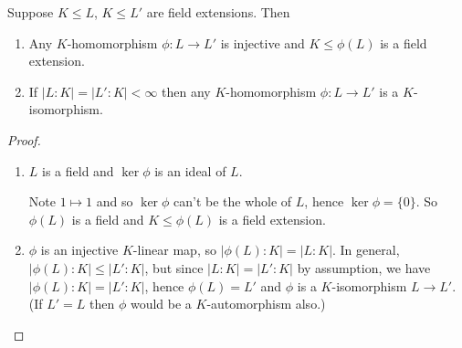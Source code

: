 \documentclass{article}
\begin{document}
\begin{nlemma}\label{lem:1.21}
    Suppose $K \leq L$, $K \leq L'$ are field extensions. Then
    \begin{enumerate}[label=(\roman*)]
        \item Any $K$-homomorphism $\phi:L \to L'$ is injective and $K \leq \phi(L)$ is a field extension.
        \item If $|L:K| = |L':K| < \infty$ then any $K$-homomorphism $\phi:L \to L'$ is a $K$-isomorphism.
    \end{enumerate}
\end{nlemma}
\begin{proof} \leavevmode
    \begin{enumerate}[label=(\roman*)]
        \item $L$ is a field and $\ker \phi$ is an ideal of $L$.

            Note $1 \mapsto 1$ and so $\ker \phi$ can't be the whole of $L$, hence $\ker \phi = \{0\}$.
            So $\phi(L)$ is a field and $K \leq \phi(L)$ is a field extension.
        \item $\phi$ is an injective $K$-linear map, so $|\phi(L):K| = |L:K|$.
            In general, $|\phi(L):K| \leq |L':K|$, but since $|L:K| = |L':K|$ by assumption, we have $|\phi(L):K| = |L':K|$, hence $\phi(L) = L'$ and $\phi$ is a $K$-isomorphism $L \to L'$.
            (If $L' = L$ then $\phi$ would be a $K$-automorphism also.) \qedhere
    \end{enumerate}
\end{proof}
\end{document}
